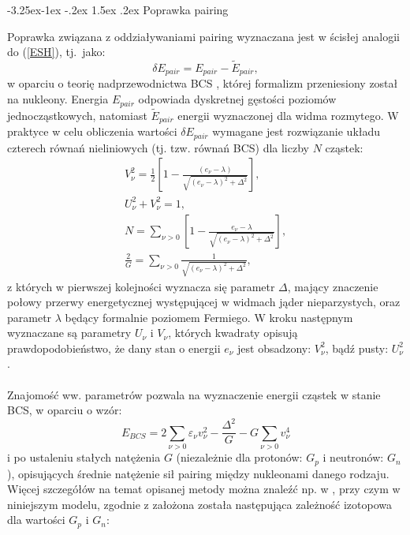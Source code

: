 \documentclass[a4paper,polish]{article}
\makeatletter
\renewcommand\subsubsection{\@startsection{subsubsection}{3}{\z@}%
	{-3.25ex\@plus -1ex \@minus -.2ex}%
	{1.5ex \@plus .2ex}%
	{\normalfont\normalsize\bfseries\boldmath}}
\numberwithin{equation}{section}
\makeatother
\begin{document}
\subsubsection{Poprawka pairing}

Poprawka związana z oddziaływaniami pairing wyznaczana jest w ścisłej analogii do (\ref{ESH}), tj.~jako:
\begin{equation}
\delta E_{pair}=E_{pair}-\widetilde{E}_{pair},
\end{equation}
w oparciu o teorię nadprzewodnictwa BCS \cite{BCS}, której formalizm przeniesiony został na nukleony. Energia $E_{pair}$ odpowiada dyskretnej gęstości poziomów jednocząstkowych, natomiast $\widetilde{E}_{pair}$ energii wyznaczonej dla widma rozmytego. W praktyce w celu obliczenia wartości $\delta E_{pair}$ wymagane jest rozwiązanie układu czterech równań nieliniowych (tj. tzw. równań BCS) dla liczby $N$ cząstek:
\begin{gather*}
V_{\nu}^2=\frac{1}{2}\left[ 1-  \frac{(e_{\nu}-\lambda)}{\sqrt{\left(e_{\nu}-\lambda\right)^2+\Delta^2}} \right], \\
U_{\nu}^2+ V_{\nu}^2 =1, \\
N = \sum_{\nu>0} \left[1- \frac{e_{\nu}-\lambda}{\sqrt{\left(e_{\nu}-\lambda\right)^2+\Delta^2}} \right], \\
\frac{2}{G} = \sum_{\nu>0} \frac{1}{\sqrt{\left(e_{\nu}-\lambda\right)^2+\Delta^2}},
\end{gather*}
z których w pierwszej kolejności wyznacza się parametr $\Delta$, mający znaczenie połowy przerwy energetycznej występującej w widmach jąder nieparzystych, oraz parametr $\lambda$ będący formalnie poziomem Fermiego. W kroku następnym wyznaczane są parametry $U_{\nu}$ i $V_{\nu}$, których kwadraty opisują prawdopodobieństwo, że dany stan o energii $e_{\nu}$ jest obsadzony: $V_{\nu}^2$, bądź pusty: $U_{\nu}^2$.\\ \\
Znajomość ww. parametrów pozwala na wyznaczenie energii cząstek w stanie BCS, w oparciu o wzór: 
\begin{equation}
E_{BCS}=2\sum_{\nu>0}^{}\varepsilon_{\nu}v^{2}_{\nu}-\frac{\Delta^{2}}{G}-G\sum_{\nu>0}^{}v^{4}_{\nu}
\end{equation}
i po ustaleniu stałych natężenia $G$ (niezależnie dla protonów: $G_p$ i neutronów: $G_n$), opisujących średnie natężenie sił pairing między nukleonami danego rodzaju. Więcej szczegółów na temat opisanej metody można znaleźć np. w \cite{Pomorski}, przy czym w niniejszym modelu, zgodnie z \cite{G} założona została następująca zależność izotopowa dla wartości $G_p$ i $G_n$:
\end{document}
